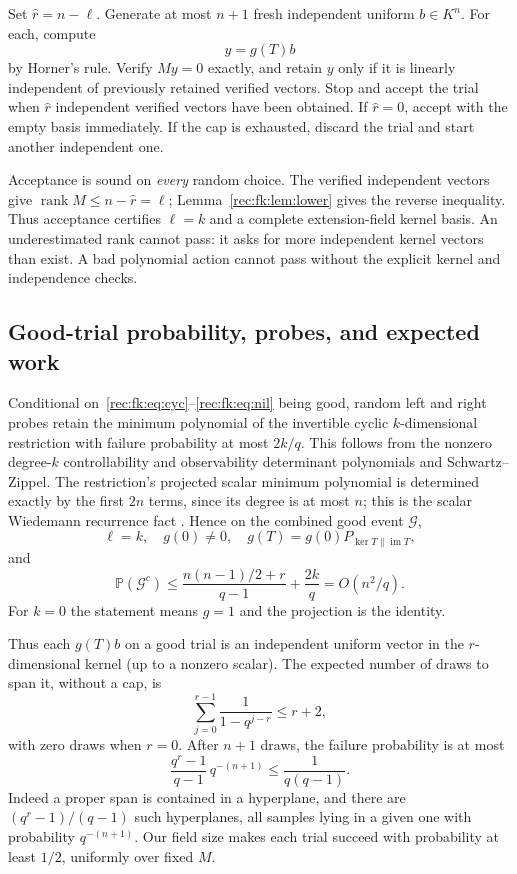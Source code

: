 \documentclass[11pt]{article}
\theoremstyle{definition}
\theoremstyle{remark}
\newcommand{\1}{\mathbf 1}
\providecommand{\Prob}{\mathbb P}
\providecommand{\rank}{\operatorname{rank}}
\begin{document}
Set $\widehat r=n-\ell$. Generate at most $n+1$ fresh independent
uniform $b\in K^n$. For each, compute
\[
 y=g(T)b
\]
by Horner's rule. Verify $My=0$ exactly, and retain $y$ only if it
is linearly independent of previously retained verified vectors.
Stop and accept the trial when $\widehat r$ independent verified
vectors have been obtained. If $\widehat r=0$, accept with the empty
basis immediately. If the cap is exhausted, discard the trial and
start another independent one.

Acceptance is sound on \emph{every} random choice. The verified
independent vectors give $\rank M\le n-\widehat r=\ell$;
Lemma~\ref{rec:fk:lem:lower} gives the reverse inequality. Thus acceptance
certifies $\ell=k$ and a complete extension-field kernel basis.
An underestimated rank cannot pass: it asks for more independent
kernel vectors than exist. A bad polynomial action cannot pass
without the explicit kernel and independence checks.

\subsection{Good-trial probability, probes, and expected work}
Conditional on~\eqref{rec:fk:eq:cyc}--\eqref{rec:fk:eq:nil} being good, random
left and right probes retain the minimum polynomial of the invertible
cyclic $k$-dimensional restriction with failure probability at most
$2k/q$. This follows from the nonzero degree-$k$ controllability and
observability determinant polynomials and Schwartz--Zippel.
The restriction's projected scalar minimum polynomial is determined
exactly by the first $2n$ terms, since its degree is at most $n$;
this is the scalar Wiedemann recurrence fact \cite[Section II]{rec:Wiedemann}.
Hence on the combined good event $\mathcal G$,
\[
 \ell=k,\quad g(0)\ne0,\quad
 g(T)=g(0)P_{\ker T\parallel\operatorname{im}T},
\]
and
\begin{equation}\label{rec:fk:eq:bad}
 \Prob(\mathcal G^c)
 \le\frac{n(n-1)/2+r}{q-1}+\frac{2k}{q}
 =O(n^2/q).
\end{equation}
For $k=0$ the statement means $g=1$ and the projection is the identity.

Thus each $g(T)b$ on a good trial is an independent uniform vector
in the $r$-dimensional kernel (up to a nonzero scalar).
The expected number of draws to span it, without a cap, is
\[
 \sum_{j=0}^{r-1}\frac1{1-q^{j-r}}\le r+2,
\]
with zero draws when $r=0$.
After $n+1$ draws, the failure probability is at most
\begin{equation}\label{rec:fk:eq:cap}
 \frac{q^r-1}{q-1}\,q^{-(n+1)}
 \le\frac1{q(q-1)}.
\end{equation}
Indeed a proper span is contained in a hyperplane, and there are
$(q^r-1)/(q-1)$ such hyperplanes, all samples lying in a given one with probability
$q^{-(n+1)}$. Our field size makes each trial succeed with
probability at least $1/2$, uniformly over fixed $M$.
\end{document}
